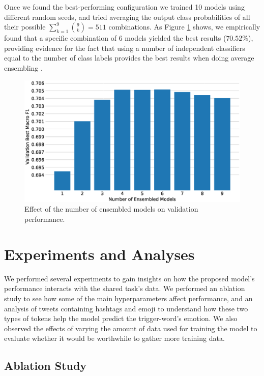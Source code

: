 \documentclass[11pt,a4paper]{article}
\begin{document}
Once we found the best-performing configuration we trained 10 models using
different random seeds, and tried averaging the output class probabilities of
all their possible $\sum_{k=1}^{9}{\binom{9}{k}}=511$ combinations. As Figure
\ref{fig:best_ensembles} shows, we empirically found that a specific combination
of $6$ models yielded the best results ($70.52\%$), providing evidence for the
fact that using a number of independent classifiers equal to the number of class
labels provides the best results when doing average ensembling
\cite{bonab2016theoretical}.


\begin{figure}[!h]
    \centering
    \includegraphics[width=\columnwidth]{images/best_ensembles.eps}
\caption{Effect of the number of ensembled models on validation performance.}
\label{fig:best_ensembles}
\end{figure}

\section{Experiments and Analyses}

We performed several experiments to gain insights on how the proposed model's
performance interacts with the shared task's data. We performed an ablation
study to see how some of the main hyperparameters affect performance, and an
analysis of tweets containing hashtags and emoji to understand how these two
types of tokens help the model predict the trigger-word's emotion. We also
observed the effects of varying the amount of data used for training the model
to evaluate whether it would be worthwhile to gather more training data.

\subsection{Ablation Study}%
\label{sub:ablation_study}
\end{document}
